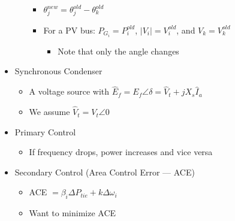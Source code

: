 \begin{itemize}
\begin{itemize}
          \begin{itemize}

            \item $\theta^{new}_j=\theta^{old}_j-\theta^{old}_k$

            \item For a PV bus: $P_{G_i}=P_i^{old}$, $|V_i|=V_i^{old}$, and $V_k=V_k^{old}$

              \begin{itemize}

                \item Note that only the angle changes

              \end{itemize}

          \end{itemize}

      \end{itemize}

    \item Synchronous Condenser

      \begin{itemize}

        \item A voltage source with $\hat{E}_f=E_f\angle{\delta}=\hat{V}_t+jX_s\hat{I}_a$

        \item We assume $\hat{V}_t=V_t\angle 0$

      \end{itemize}

    \item Primary Control

      \begin{itemize}

        \item If frequency drops, power increases and vice versa

      \end{itemize}

    \item Secondary Control (Area Control Error — ACE)

      \begin{itemize}

        \item ACE $=\beta_i\Delta P_{tie}+k\Delta\omega_i$

        \item Want to minimize ACE

      \end{itemize}


\end{itemize}
